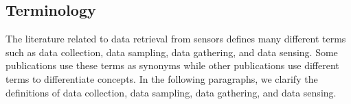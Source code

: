 
\subsection{Terminology}


The literature related to data retrieval from sensors defines many different terms such as data collection, data sampling, data gathering, and data sensing.
Some publications use these terms as synonyms while other publications use different terms to differentiate concepts.
In the following paragraphs, we clarify the definitions of data collection, data sampling, data gathering, and data sensing.



